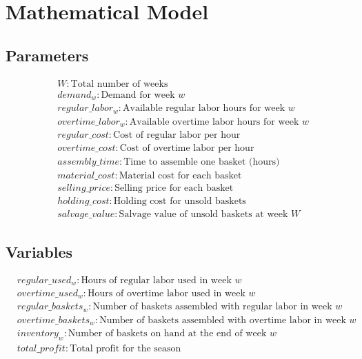 \documentclass{article}
\begin{document}
\section*{Mathematical Model}

\subsection*{Parameters}
\begin{align*}
& W: \text{Total number of weeks} \\
& demand_{w}: \text{Demand for week } w \\
& regular\_labor_{w}: \text{Available regular labor hours for week } w \\
& overtime\_labor_{w}: \text{Available overtime labor hours for week } w \\
& regular\_cost: \text{Cost of regular labor per hour} \\
& overtime\_cost: \text{Cost of overtime labor per hour} \\
& assembly\_time: \text{Time to assemble one basket (hours)} \\
& material\_cost: \text{Material cost for each basket} \\
& selling\_price: \text{Selling price for each basket} \\
& holding\_cost: \text{Holding cost for unsold baskets} \\
& salvage\_value: \text{Salvage value of unsold baskets at week } W
\end{align*}

\subsection*{Variables}
\begin{align*}
& regular\_used_{w}: \text{Hours of regular labor used in week } w \\
& overtime\_used_{w}: \text{Hours of overtime labor used in week } w \\
& regular\_baskets_{w}: \text{Number of baskets assembled with regular labor in week } w \\
& overtime\_baskets_{w}: \text{Number of baskets assembled with overtime labor in week } w \\
& inventory_{w}: \text{Number of baskets on hand at the end of week } w \\
& total\_profit: \text{Total profit for the season}
\end{align*}
\end{document}
